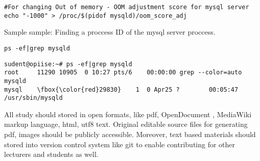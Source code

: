 \begin{verbatim}
#For changing Out of memory - OOM adjustment score for mysql server
echo "-1000" > /proc/$(pidof mysqld)/oom_score_adj
\end{verbatim}



Sample sample: Finding a proccess ID of the mysql server proccess.

\begin{verbatim}
ps -ef|grep mysqld
\end{verbatim}
\label{code_sample}
%
\small{
\begin{Verbatim}[frame=single,
label=Command output,framesep=2mm,rulecolor=\color{red},commandchars=\\\{\}]
sudent@opiise:~# ps -ef|grep mysqld
root     11290 10905  0 10:27 pts/6    00:00:00 grep --color=auto mysqld
mysql    \fbox{\color{red}29830}    1  0 Apr25 ?        00:05:47 /usr/sbin/mysqld
\end{Verbatim}
%
}

All study should stored in open formats, like pdf, OpenDocument , MediaWiki markup language, html, utf8 text. Original editable source files for generating pdf, images should be publicly accessible. Moreover, text based materials should stored into version control system like \gls{git} to enable contributing for other lecturers and students as well.



